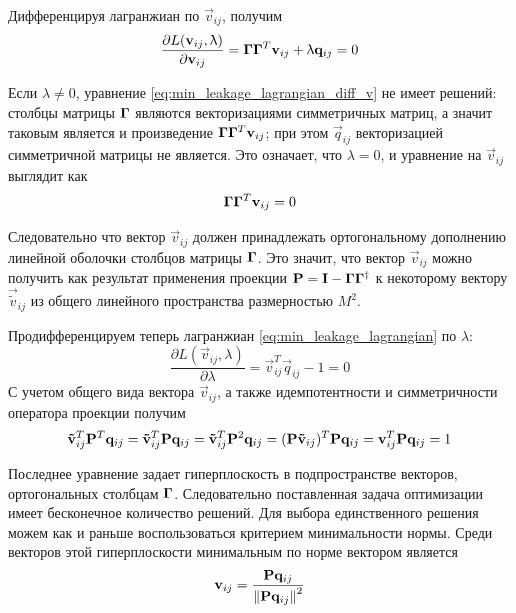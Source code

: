 Дифференцируя лагранжиан по $\vec{v}_{ij}$, получим
\begin{equation}
    \frac{\partial L(\mathbf{v}_{ij}, \uplambda)}{\partial \mathbf{v}_{ij}} = \mathbf{\Gamma} \mathbf{\Gamma}^T\mathbf{v}_{ij} + \uplambda \mathbf{q}_{ij} = 0
    \label{eq:min_leakage_lagrangian_diff_v}
\end{equation}

Если $\lambda \neq 0$, уравнение \ref{eq:min_leakage_lagrangian_diff_v} не имеет решений:
столбцы матрицы $\mathbf{\Gamma}$ являются векторизациями симметричных матриц, а
значит таковым является и произведение $\mathbf{\Gamma} \mathbf{\Gamma}^T\mathbf{v}_{ij}$; при этом
$\vec{q}_{ij}$ векторизацией симметричной матрицы не является. Это означает, что $\lambda = 0$,
и уравнение на $\vec{v}_{ij}$ выглядит как 
\begin{equation}
    \mathbf{\Gamma} \mathbf{\Gamma}^T\mathbf{v}_{ij} = 0
\end{equation}

Следовательно что вектор $\vec{v}_{ij}$ должен принадлежать ортогональному
дополнению линейной оболочки столбцов матрицы $\mathbf{\Gamma}$. Это значит, что
вектор $\vec{v}_{ij}$ можно получить как результат применения проекции
$\mathbf{P} = \mathbf{I} - \mathbf{\Gamma} \mathbf{\Gamma} ^ {\dagger}$
к некоторому вектору $\vec{\tilde{v}}_{ij}$ из общего линейного пространства размерностью $M^2$.

Продифференцируем теперь лагранжиан \ref{eq:min_leakage_lagrangian} по $\lambda$:
\begin{equation}
    \frac{\partial L(\vec{v}_{ij}, \lambda)}{\partial \lambda} = \vec{v}_{ij}^T \vec{q}_{ij} - 1 = 0
    \label{eq:min_leakage_lagrangian_diff_lambda}
\end{equation}
С учетом общего вида вектора $\vec{v}_{ij}$, а также идемпотентности и
симметричности оператора проекции получим
\begin{equation}
    \mathbf{\tilde{v}}_{ij}^T \mathbf{P}^T \mathbf{q}_{ij} = 
    \mathbf{\tilde{v}}_{ij}^T \mathbf{P} \mathbf{q}_{ij} =
    \mathbf{\tilde{v}}_{ij}^T \mathbf{P}^2 \mathbf{q}_{ij} =
    (\mathbf{P}\mathbf{\tilde{v}}_{ij})^T \mathbf{P} \mathbf{q}_{ij} =
    \mathbf{v}_{ij}^T \mathbf{P} \mathbf{q}_{ij} = 1
\end{equation}

Последнее уравнение задает гиперплоскость в подпространстве векторов, ортогональных
столбцам $\mathbf{\Gamma}$. Следовательно поставленная задача оптимизации имеет бесконечное
количество решений. Для выбора единственного решения можем как и раньше воспользоваться
критерием минимальности нормы.
Среди векторов этой гиперплоскости минимальным по норме вектором
является
\begin{equation}
    \mathbf{v}_{ij} = \frac{\mathbf{P} \mathbf{q}_{ij} } { \left\lVert\mathbf{P} \mathbf{q}_{ij}\right\rVert^2 }
    \label{eq:min_leakage_solution}
\end{equation}

